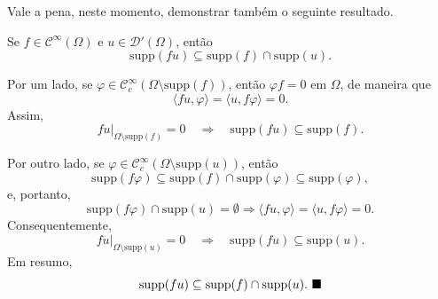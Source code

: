 \documentclass[../distribution_theory_notes.tex]{subfiles}
\begin{document}
Vale a pena, neste momento, demonstrar também o seguinte resultado.
\begin{lemma*}
	Se \(f\in \mathcal{C}^{\infty}(\Omega )\) e \(u\in \mathcal{D}'(\Omega )\), então
	\[
		\mathrm{supp}(fu)\subseteq \mathrm{supp}(f)\cap \mathrm{supp}(u).
	\]
\end{lemma*}
\begin{proof*}
	Por um lado, se \(\varphi \in \mathcal{C}_{c}^{\infty}(\Omega \setminus{\mathrm{supp}(f)})\), então \(\varphi f=0\) em \(\Omega \), de maneira que
	\[
		\langle fu, \varphi  \rangle=\langle u, f\varphi  \rangle=0.
	\]
	Assim,
	\[
		fu|_{\Omega \setminus{\mathrm{supp}(f)}}=0
		\quad\Longrightarrow\quad
		\mathrm{supp}(fu)\subseteq \mathrm{supp}(f).
	\]

	Por outro lado, se \(\varphi \in \mathcal{C}_{c}^{\infty}(\Omega \setminus{\mathrm{supp}(u)})\), então
	\[
		\mathrm{supp}(f\varphi )\subseteq \mathrm{supp}(f)\cap \mathrm{supp}(\varphi )\subseteq \mathrm{supp}(\varphi ),
	\]
	e, portanto,
	\[
		\mathrm{supp}(f\varphi )\cap \mathrm{supp}(u)=\emptyset
		\Longrightarrow
		\langle fu, \varphi  \rangle=\langle u, f\varphi  \rangle=0.
	\]
	Consequentemente,
	\[
		fu|_{\Omega \setminus{\mathrm{supp}(u)}}=0
		\quad\Longrightarrow\quad
		\mathrm{supp}(fu)\subseteq \mathrm{supp}(u).
	\]
	Em resumo,
	\[
		\mathrm{supp}(fu)\subseteq \mathrm{supp}(f)\cap \mathrm{supp}(u).\text{ $\blacksquare$}
	\]
\end{proof*}
\end{document}
